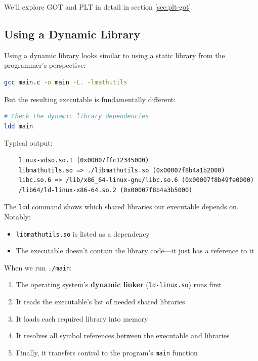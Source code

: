 We'll explore GOT and PLT in detail in section \ref{sec:plt-got}.

\subsection{Using a Dynamic Library}

Using a dynamic library looks similar to using a static library from the programmer's perspective:

\begin{lstlisting}[language=bash]
gcc main.c -o main -L. -lmathutils
\end{lstlisting}

But the resulting executable is fundamentally different:

\begin{lstlisting}[language=bash]
# Check the dynamic library dependencies
ldd main
\end{lstlisting}

Typical output:
\begin{verbatim}
    linux-vdso.so.1 (0x00007ffc12345000)
    libmathutils.so => ./libmathutils.so (0x00007f8b4a1b2000)
    libc.so.6 => /lib/x86_64-linux-gnu/libc.so.6 (0x00007f8b49fe0000)
    /lib64/ld-linux-x86-64.so.2 (0x00007f8b4a3b5000)
\end{verbatim}

The \texttt{ldd} command shows which shared libraries our executable depends on. Notably:
\begin{itemize}
    \item \texttt{libmathutils.so} is listed as a dependency
    \item The executable doesn't contain the library code—it just has a reference to it
\end{itemize}

When we run \texttt{./main}:
\begin{enumerate}
    \item The operating system's \textbf{dynamic linker} (\texttt{ld-linux.so}) runs first
    \item It reads the executable's list of needed shared libraries
    \item It loads each required library into memory
    \item It resolves all symbol references between the executable and libraries
    \item Finally, it transfers control to the program's \texttt{main} function
\end{enumerate}

